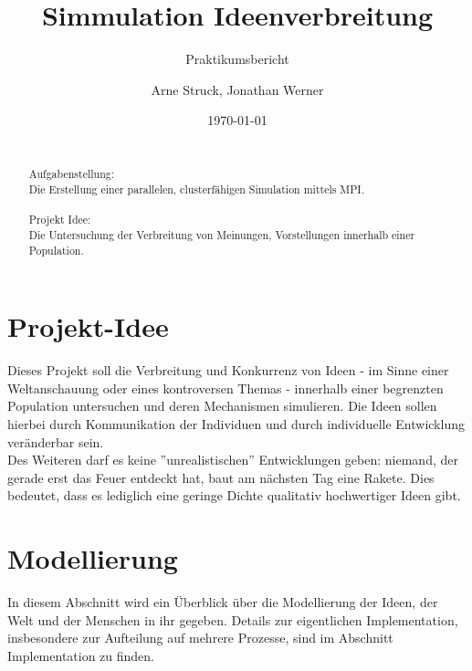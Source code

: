 \title{Simmulation Ideenverbreitung}
\subtitle{Praktikumsbericht}

\author{Arne Struck, Jonathan Werner}

  
\date{\today}

\maketitle


\begin{abstract}
\quad \\
Aufgabenstellung: \\
Die Erstellung einer parallelen, clusterfähigen Simulation mittels MPI. \\ \\
Projekt Idee: \\
Die Untersuchung der Verbreitung von Meinungen, Vorstellungen innerhalb einer Population.
\end{abstract}

\tableofcontents
\newpage
\section{Projekt-Idee}
Dieses Projekt soll die Verbreitung und Konkurrenz von Ideen - im Sinne einer Weltanschauung oder eines kontroversen Themas - innerhalb einer begrenzten Population untersuchen und deren Mechanismen simulieren. 
Die Ideen sollen hierbei durch Kommunikation der Individuen und durch individuelle Entwicklung veränderbar sein. \\
Des Weiteren darf es keine ''unrealistischen'' Entwicklungen geben: niemand, der gerade erst das Feuer entdeckt hat, baut am nächsten Tag eine Rakete. Dies bedeutet, dass es lediglich eine geringe Dichte qualitativ hochwertiger Ideen gibt.

\section{Modellierung}
In diesem Abschnitt wird ein Überblick über die Modellierung der Ideen, der Welt und der Menschen in ihr gegeben. 
Details zur eigentlichen Implementation, insbesondere zur Aufteilung auf mehrere Prozesse, sind im Abschnitt Implementation zu finden.
